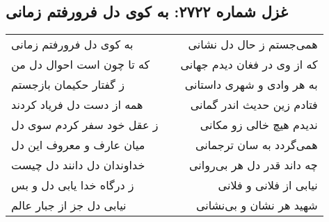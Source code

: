 \begin{center}
\section*{غزل شماره ۲۷۲۲: به کوی دل فرورفتم زمانی}
\label{sec:2722}
\begin{longtable}{l p{0.5cm} r}
به کوی دل فرورفتم زمانی
&&
همی‌جستم ز حال دل نشانی
\\
که تا چون است احوال دل من
&&
که از وی در فغان دیدم جهانی
\\
ز گفتار حکیمان بازجستم
&&
به هر وادی و شهری داستانی
\\
همه از دست دل فریاد کردند
&&
فتادم زین حدیث اندر گمانی
\\
ز عقل خود سفر کردم سوی دل
&&
ندیدم هیچ خالی زو مکانی
\\
میان عارف و معروف این دل
&&
همی‌گردد به سان ترجمانی
\\
خداوندان دل دانند دل چیست
&&
چه داند قدر دل هر بی‌روانی
\\
ز درگاه خدا یابی دل و بس
&&
نیابی از فلانی و فلانی
\\
نیابی دل جز از جبار عالم
&&
شهید هر نشان و بی‌نشانی
\\
\end{longtable}
\end{center}
